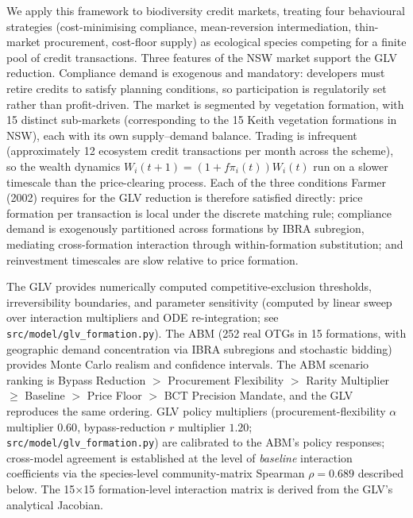 \documentclass[pdflatex,sn-nature,oneside]{sn-jnl}
\begin{document}
We apply this framework to biodiversity credit markets, treating four behavioural strategies (cost-minimising compliance, mean-reversion intermediation, thin-market procurement, cost-floor supply) as ecological species competing for a finite pool of credit transactions. Three features of the NSW market support the GLV reduction. Compliance demand is exogenous and mandatory: developers must retire credits to satisfy planning conditions, so participation is regulatorily set rather than profit-driven. The market is segmented by vegetation formation, with 15 distinct sub-markets (corresponding to the 15 Keith vegetation formations in NSW), each with its own supply--demand balance. Trading is infrequent (approximately 12 ecosystem credit transactions per month across the scheme), so the wealth dynamics $W_i(t+1)=(1+f\pi_i(t))W_i(t)$ run on a slower timescale than the price-clearing process. Each of the three conditions Farmer (2002) requires for the GLV reduction is therefore satisfied directly: price formation per transaction is local under the discrete matching rule; compliance demand is exogenously partitioned across formations by IBRA subregion, mediating cross-formation interaction through within-formation substitution; and reinvestment timescales are slow relative to price formation.

The GLV provides numerically computed competitive-exclusion thresholds, irreversibility boundaries, and parameter sensitivity (computed by linear sweep over interaction multipliers and ODE re-integration; see \texttt{src/model/glv\_formation.py}). The ABM (252 real OTGs in 15 formations, with geographic demand concentration via IBRA subregions and stochastic bidding) provides Monte Carlo realism and confidence intervals. The ABM scenario ranking is Bypass Reduction $>$ Procurement Flexibility $>$ Rarity Multiplier $\geq$ Baseline $>$ Price Floor $>$ BCT Precision Mandate, and the GLV reproduces the same ordering. GLV policy multipliers (procurement-flexibility $\alpha$ multiplier $0.60$, bypass-reduction $r$ multiplier $1.20$; \texttt{src/model/glv\_formation.py}) are calibrated to the ABM's policy responses; cross-model agreement is established at the level of \emph{baseline} interaction coefficients via the species-level community-matrix Spearman $\rho = 0.689$ described below. The 15$\times$15 formation-level interaction matrix is derived from the GLV's analytical Jacobian.
\end{document}
